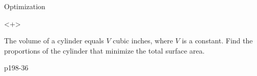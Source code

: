 \begin{frame}{Optimization}
\begin{onlyenv}
\begin{example}
\end{example}

\end{onlyenv}



\begin{onlyenv}<+>

\begin{example}
The volume of a cylinder equals $V$ cubic inches, where $V$ is a
constant. Find the proportions of the cylinder that minimize the total
surface area.
\end{example}



\begin{example}
p198-36
\end{example}

\end{onlyenv}

\end{frame}

